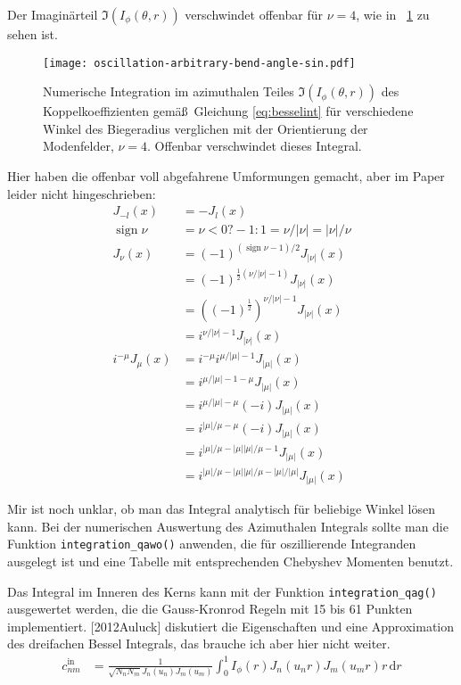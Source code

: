 \documentclass[DIV19,twocolumn]{scrartcl}
\def\({\left(}
\def\){\right)}
\DeclareMathOperator{\sign}{sign}
\newcommand{\figref}[1]{\figurename~\ref{#1}}
\begin{document}
Der Imagin\"arteil $\Im\(I_\phi(\theta,r)\)$ verschwindet offenbar
f\"ur $\nu=4$, wie in \figref{fig:besselint-im} zu sehen ist.
\begin{figure}[!hbt]
  \centering
  \texttt{[image: oscillation-arbitrary-bend-angle-sin.pdf]}
  \caption{Numerische Integration im azimuthalen Teiles $\Im\(I_\phi(\theta,r)\)$ des
    Koppelkoeffizienten gem\"a\ss\ Gleichung \eqref{eq:besselint}
    f\"ur verschiedene Winkel des Biegeradius verglichen mit der
    Orientierung der Modenfelder, $\nu=4$. Offenbar verschwindet dieses Integral.}
  \label{fig:besselint-im}
\end{figure}



Hier haben die offenbar voll abgefahrene Umformungen gemacht, aber im
Paper leider nicht hingeschrieben:
\begin{align}
J_{-l}(x) &= -J_l(x) \\
\sign \nu &= \nu<0 ? -1 : 1 = \nu/|\nu| = |\nu|/\nu \\
J_\nu(x) &= (-1)^{(\sign{\nu}-1)/2} J_{|\nu|}(x) \\ 
& = (-1)^{\frac{1}{2}(\nu/|\nu|-1)} J_{|\nu|}(x) \\ 
& = ((-1)^{\frac{1}{2}})^{\nu/|\nu|-1} J_{|\nu|}(x) \\ 
& = i^{\nu/|\nu|-1} J_{|\nu|}(x)\\
i^{-\mu} J_\mu(x) &= i^{-\mu} i^{\mu/|\mu|-1} J_{|\mu|}(x)\\
&= i^{\mu/|\mu|-1 -\mu } J_{|\mu|}(x) \\
&= i^{\mu/|\mu| -\mu } (-i) J_{|\mu|}(x) \\
&= i^{|\mu|/\mu-\mu} (-i) J_{|\mu|}(x) \\
&= i^{|\mu|/\mu-|\mu| |\mu| /\mu-1} J_{|\mu|}(x) \\
&= i^{|\mu|/\mu-|\mu| |\mu| /\mu-|\mu|/|\mu|} J_{|\mu|}(x)
\end{align}


Mir ist noch unklar, ob man das Integral analytisch f\"ur beliebige
Winkel l\"osen kann.  Bei der numerischen Auswertung des Azimuthalen
Integrals sollte man die Funktion \verb!integration_qawo()! anwenden,
die f\"ur oszillierende Integranden ausgelegt ist und eine Tabelle mit
entsprechenden Chebyshev Momenten benutzt.

Das Integral im Inneren des Kerns kann mit der Funktion
\verb!integration_qag()! ausgewertet werden, die die Gauss-Kronrod
Regeln mit 15 bis 61 Punkten implementiert.  [2012Auluck] diskutiert
die Eigenschaften und eine Approximation des dreifachen Bessel
Integrals, das brauche ich aber hier nicht weiter.
\begin{align}
    c_{nm}^\textrm{in}&=\frac{1}{\sqrt{N_n N_m} J_n(u_n) J_m(u_m)}
    \int_0^1\!\!\!\! I_\phi(r) J_n(u_n r) J_m(u_m r) r\, \textrm{d}r 
\end{align}
\end{document}
